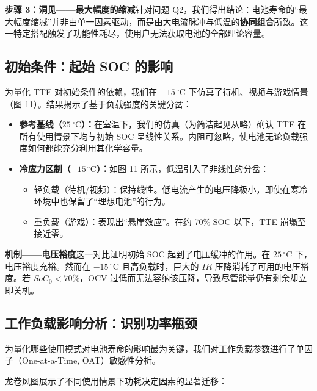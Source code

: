 \documentclass[11pt,a4paper]{ctexart}
\begin{document}
\noindent\textbf{步骤 3：洞见——最大幅度的缩减}\quad 针对问题 Q2，我们得出结论：电池寿命的“最大幅度缩减”并非由单一因素驱动，而是由大电流脉冲与低温的\textbf{协同组合}所致。这一特定搭配触发了功能性耗尽，使用户无法获取电池的全部理论容量。

\subsection{初始条件：起始 SOC 的影响}

为量化 TTE 对初始条件的依赖，我们在 $-15\,^{\circ}\mathrm{C}$ 下仿真了待机、视频与游戏情景（图 11）。结果揭示了基于负载强度的关键分岔：

\begin{itemize}[leftmargin=1.6em,itemsep=0.3em]
\item \textbf{参考基线（$25\,^{\circ}\mathrm{C}$）：}在室温下，我们的仿真（为简洁起见从略）确认 TTE 在所有使用情景下均与初始 SOC 呈线性关系。内阻可忽略，使电池无论负载强度如何都能充分利用其化学容量。
\item \textbf{冷应力区制（$-15\,^{\circ}\mathrm{C}$）：}如图 11 所示，低温引入了非线性的分岔：
\begin{itemize}[leftmargin=1.4em,itemsep=0.1em]
\item 轻负载（待机/视频）：保持线性。低电流产生的电压降极小，即使在寒冷环境中也保留了“理想电池”的行为。
\item 重负载（游戏）：表现出“悬崖效应”。在约 70\% SOC 以下，TTE 崩塌至接近零。
\end{itemize}
\end{itemize}

\noindent\textbf{机制——电压裕度}\quad 这一对比证明初始 SOC 起到了电压缓冲的作用。在 $25\,^{\circ}\mathrm{C}$ 下，电压裕度充裕。然而在 $-15\,^{\circ}\mathrm{C}$ 且高负载时，巨大的 $IR$ 压降消耗了可用的电压裕度。若 $SoC_0<70\%$，OCV 过低而无法容纳该压降，导致尽管能量仍有剩余却立即关机。

\subsection{工作负载影响分析：识别功率瓶颈}

为量化哪些使用模式对电池寿命的影响最为关键，我们对工作负载参数进行了单因子（One-at-a-Time, OAT）敏感性分析。

龙卷风图展示了不同使用情景下功耗决定因素的显著迁移：
\end{document}
